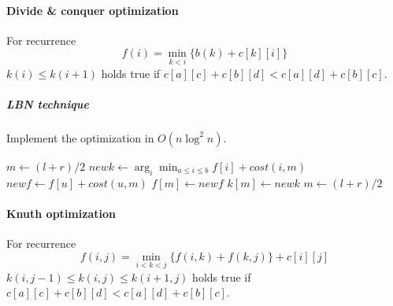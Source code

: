 \paragraph{Divide \& conquer optimization}
	For recurrence
	$$f(i) = \min_{k<i}\{b(k)+c[k][i]\}$$
	$k(i) \leq k(i+1)$ holds true if $c[a][c]+c[b][d]<c[a][d]+c[b][c]$.

	\subparagraph{LBN technique}
	Implement the optimization in $O(n\log^2n)$.
	\begin{algorithmic}
				\State $m\gets (l+r)/2$
				\State $newk\gets\arg_i\min_{a\le i \le b}f[i]+cost(i,m)$
				\State $newf\gets f[u]+cost(u,m)$
					\State $f[m]\gets newf$
					\State $k[m]\gets newk$
					\State {}
				\EndIf
				\State {}
			\EndIf
		\EndFunction
				\State $m\gets (l+r)/2$
				\State {}
				\State {}
				\State {}
			\EndIf
		\EndFunction
	\end{algorithmic}

\paragraph{Knuth optimization}
	For recurrence
	$$f(i,j) = \min_{i<k<j}\{f(i,k)+f(k,j)\}+c[i][j]$$
	$k(i,j-1) \leq k(i,j) \leq k(i+1,j)$ holds true if $c[a][c]+c[b][d]<c[a][d]+c[b][c]$.
